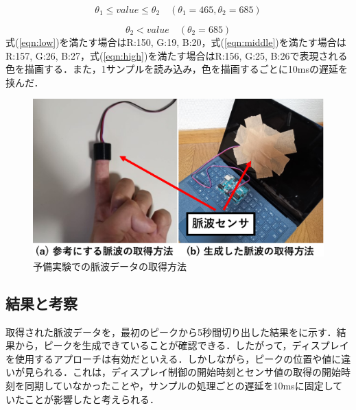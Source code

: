 \documentclass[Japanese,noauthor]{dicomopapers}
\begin{document}
\begin{equation}
	\label{eqn:middle}
	\theta_{1} \leq value \leq \theta_{2} \quad (\theta_{1}=465, \theta_{2}=685)
\end{equation}

\begin{equation}
	\label{eqn:high}
	\theta_{2} < value \quad (\theta_{2}=685)
\end{equation}
式(\ref{eqn:low})を満たす場合はR:150, G:19, B:20，式(\ref{eqn:middle})を満たす場合はR:157, G:26, B:27，式(\ref{eqn:high})を満たす場合はR:156, G:25, B:26で表現される色を描画する．また，1サンプルを読み込み，色を描画するごとに10msの遅延を挟んだ．

\begin{figure}[!t]
	\begin{center}
		\includegraphics[width=1\linewidth]{figures/preliminary_sensors.eps}
	\end{center}
	\caption{予備実験での脈波データの取得方法}
	\label{fig:preliminary_sensors}
\end{figure}


\subsection{結果と考察}
取得された脈波データを，最初のピークから5秒間切り出した結果をに示す．結果から，ピークを生成できていることが確認できる．したがって，ディスプレイを使用するアプローチは有効だといえる．しかしながら，ピークの位置や値に違いが見られる．これは，ディスプレイ制御の開始時刻とセンサ値の取得の開始時刻を同期していなかったことや，サンプルの処理ごとの遅延を10msに固定していたことが影響したと考えられる．
\end{document}
